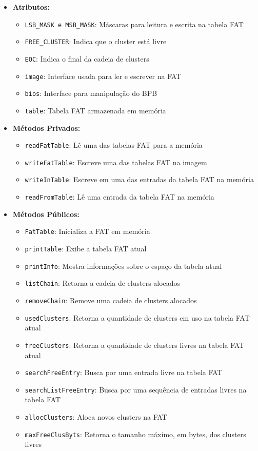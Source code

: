 \documentclass[
    12pt,				%
    oneside,   	        %
    a4paper,			%
    english,			%
    french,				%
    spanish,			%
    brazil,				%
    ]{pacotes/abntex2}
\begin{document}
\begin{itemize}
    \item \textbf{Atributos:}
        \begin{itemize}
            \item \texttt{LSB\_MASK e MSB\_MASK}: Máscaras para leitura e escrita na tabela FAT
            \item \texttt{FREE\_CLUSTER}: Indica que o cluster está livre
            \item \texttt{EOC}: Indica o final da cadeia de clusters
            \item \texttt{image}: Interface usada para ler e escrever na FAT
            \item \texttt{bios}: Interface para manipulação do BPB
            \item \texttt{table}: Tabela FAT armazenada em memória
        \end{itemize}
    \item \textbf{Métodos Privados:}
        \begin{itemize}
            \item \texttt{readFatTable}: Lê uma das tabelas FAT para a memória
            \item \texttt{writeFatTable}: Escreve uma das tabelas FAT na imagem
            \item \texttt{writeInTable}: Escreve em uma das entradas da tabela FAT na memória
            \item \texttt{readFromTable}: Lê uma entrada da tabela FAT na memória
        \end{itemize}
    \item \textbf{Métodos Públicos:}
        \begin{itemize}
            \item \texttt{FatTable}: Inicializa a FAT em memória
            \item \texttt{printTable}: Exibe a tabela FAT atual
            \item \texttt{printInfo}: Mostra informações sobre o espaço da tabela atual
            \item \texttt{listChain}: Retorna a cadeia de clusters alocados
            \item \texttt{removeChain}: Remove uma cadeia de clusters alocados
            \item \texttt{usedClusters}: Retorna a quantidade de clusters em uso na tabela FAT atual
            \item \texttt{freeClusters}: Retorna a quantidade de clusters livres na tabela FAT atual
            \item \texttt{searchFreeEntry}: Busca por uma entrada livre na tabela FAT
            \item \texttt{searchListFreeEntry}: Busca por uma sequência de entradas livres na tabela FAT
            \item \texttt{allocClusters}: Aloca novos clusters na FAT
            \item \texttt{maxFreeClusByts}: Retorna o tamanho máximo, em bytes, dos clusters livres
        \end{itemize}
\end{itemize}
\end{document}
